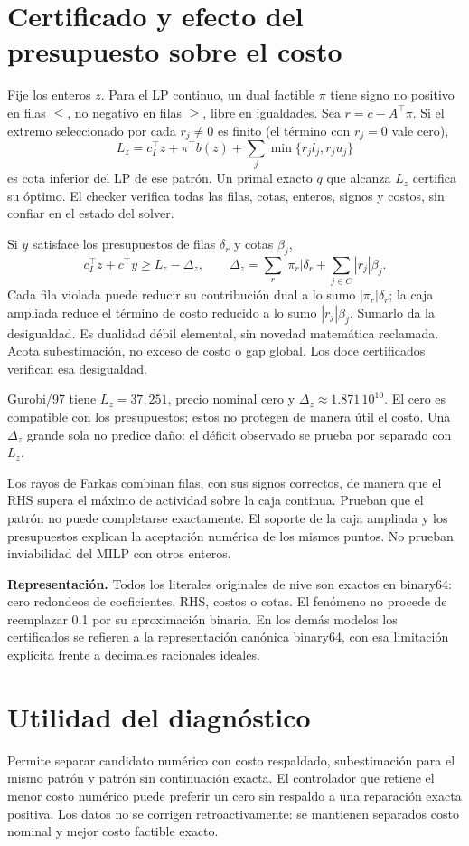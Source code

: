 \documentclass[10pt,a4paper]{article}
\begin{document}
\section*{Certificado y efecto del presupuesto sobre el costo}
Fije los enteros $z$. Para el LP continuo, un dual factible $\pi$ tiene
signo no positivo en filas $\le$, no negativo en filas $\ge$, libre en
igualdades. Sea $r=c-A^\top\pi$. Si el extremo seleccionado por cada
$r_j\ne0$ es finito (el término con $r_j=0$ vale cero),
\[
L_z=c_I^\top z+\pi^\top b(z)+\sum_j\min\{r_jl_j,r_ju_j\}
\]
es cota inferior del LP de ese patrón. Un primal exacto $q$ que alcanza
$L_z$ certifica su óptimo. El checker verifica todas las filas, cotas,
enteros, signos y costos, sin confiar en el estado del solver.

Si $y$ satisface los presupuestos de filas $\delta_r$ y cotas $\beta_j$,
\[
c_I^\top z+c^\top y\ge L_z-\Delta_z,\qquad
\Delta_z=\sum_r|\pi_r|\delta_r+\sum_{j\in C}|r_j|\beta_j.
\]
Cada fila violada puede reducir su contribución dual a lo sumo
$|\pi_r|\delta_r$; la caja ampliada reduce el término de costo reducido
a lo sumo $|r_j|\beta_j$. Sumarlo da la desigualdad. Es dualidad débil
elemental, sin novedad matemática reclamada. Acota subestimación, no exceso
de costo o gap global. Los doce certificados verifican esa desigualdad.

Gurobi/97 tiene $L_z=37,251$, precio nominal cero y
$\Delta_z\approx1.871\,10^{10}$. El cero es compatible con los presupuestos;
estos no protegen de manera útil el costo. Una $\Delta_z$ grande sola no
predice daño: el déficit observado se prueba por separado con $L_z$.

Los rayos de Farkas combinan filas, con sus signos correctos, de manera que
el RHS supera el máximo de actividad sobre la caja continua. Prueban que
el patrón no puede completarse exactamente. El soporte de la caja ampliada
y los presupuestos explican la aceptación numérica de los mismos puntos.
No prueban inviabilidad del MILP con otros enteros.

\textbf{Representación.} Todos los literales originales de nive son exactos
en binary64: cero redondeos de coeficientes, RHS, costos o cotas. El fenómeno
no procede de reemplazar 0.1 por su aproximación binaria. En los demás
modelos los certificados se refieren a la representación canónica binary64,
con esa limitación explícita frente a decimales racionales ideales.
\section*{Utilidad del diagnóstico}
Permite separar candidato numérico con costo respaldado, subestimación para
el mismo patrón y patrón sin continuación exacta. El controlador que
retiene el menor costo numérico puede preferir un cero sin respaldo a una
reparación exacta positiva. Los datos no se corrigen retroactivamente:
se mantienen separados costo nominal y mejor costo factible exacto.
\end{document}
